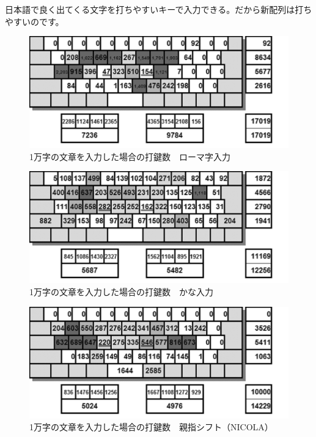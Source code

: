 日本語で良く出てくる文字を打ちやすいキーで入力できる。だから新配列は打ちやすいのです。

\begin{figure}
 \begin{center}
   \includegraphics[width=14cm,clip]{res_kouy/dakensuu_ro-maji.eps}
 \end{center}
 \caption{1万字の文章を入力した場合の打鍵数　ローマ字入力}
 \label{dakensuu_ro-maji}
\end{figure}

\begin{figure}
 \begin{center}
   \includegraphics[width=14cm,clip]{res_kouy/dakensuu_JIS-kana.eps}
 \end{center}
 \caption{1万字の文章を入力した場合の打鍵数　かな入力}
 \label{dakensuu_JIS-kana}
\end{figure}

\begin{figure}
 \begin{center}
   \includegraphics[width=14cm,clip]{res_kouy/dakensuu_NICOLA.eps}
 \end{center}
 \caption{1万字の文章を入力した場合の打鍵数　親指シフト（NICOLA）}
 \label{dakensuu_NICOLA}
\end{figure}

